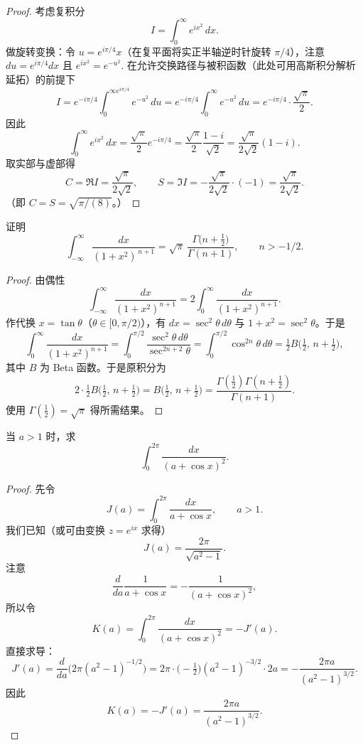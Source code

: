 \documentclass[lang=cn,10pt]{elegantbook}
\begin{document}
	\begin{proof}
		考虑复积分
		\[
		I=\int_0^\infty e^{i x^2}\,dx.
		\]
		做旋转变换：令 \(u=e^{i\pi/4}x\)（在复平面将实正半轴逆时针旋转 \(\pi/4\)），注意 \(du=e^{i\pi/4}dx\) 且 \(e^{ix^2}=e^{-u^2}\). 在允许交换路径与被积函数（此处可用高斯积分解析延拓）的前提下
		\[
		I=e^{-i\pi/4}\int_0^{\infty e^{i\pi/4}} e^{-u^2}\,du
		= e^{-i\pi/4}\int_0^{\infty} e^{-u^2}\,du
		= e^{-i\pi/4}\cdot\frac{\sqrt{\pi}}{2}.
		\]
		因此
		\[
		\int_0^\infty e^{ix^2}\,dx = \frac{\sqrt{\pi}}{2} e^{-i\pi/4}
		= \frac{\sqrt{\pi}}{2}\frac{1-i}{\sqrt{2}} = \frac{\sqrt{\pi}}{2\sqrt{2}}(1-i).
		\]
		取实部与虚部得
		\[
		C=\Re I=\frac{\sqrt{\pi}}{2\sqrt{2}},\qquad
		S=\Im I=-\frac{\sqrt{\pi}}{2\sqrt{2}}\cdot(-1)=\frac{\sqrt{\pi}}{2\sqrt{2}}.
		\]
		（即 \(C=S=\sqrt{\pi/(8)}\)。）
	\end{proof}
	
	\bigskip
	
	\begin{example}
		证明
		\[
		\int_{-\infty}^{\infty}\frac{dx}{(1+x^2)^{\,n+1}}
		=\sqrt{\pi}\,\frac{\Gamma\!\big(n+\tfrac12\big)}{\Gamma(n+1)},\qquad n>-1/2.
		\]
	\end{example}
	
	\begin{proof}
		由偶性
		\[
		\int_{-\infty}^{\infty}\frac{dx}{(1+x^2)^{n+1}}
		=2\int_0^\infty\frac{dx}{(1+x^2)^{n+1}}.
		\]
		作代换 \(x=\tan\theta\)（\(\theta\in[0,\pi/2)\)），有 \(dx=\sec^2\theta\,d\theta\) 与 \(1+x^2=\sec^2\theta\)。于是
		\[
		\int_0^\infty\frac{dx}{(1+x^2)^{n+1}}
		=\int_0^{\pi/2}\frac{\sec^2\theta\,d\theta}{\sec^{2n+2}\theta}
		=\int_0^{\pi/2}\cos^{2n}\theta\,d\theta
		=\tfrac12 B\!\Big(\tfrac{1}{2},\,n+\tfrac12\Big),
		\]
		其中 \(B\) 为 Beta 函数。于是原积分为
		\[
		2\cdot \tfrac12 B\!\Big(\tfrac{1}{2},\,n+\tfrac12\Big)
		= B\!\Big(\tfrac{1}{2},\,n+\tfrac12\Big)
		= \frac{\Gamma(\tfrac12)\Gamma(n+\tfrac12)}{\Gamma(n+1)}.
		\]
		使用 \(\Gamma(\tfrac12)=\sqrt{\pi}\) 得所需结果。
	\end{proof}
	
	\bigskip
	
	\begin{example}
		当 \(a>1\) 时，求
		\[
		\int_0^{2\pi}\frac{dx}{(a+\cos x)^2}.
		\]
	\end{example}
	
	\begin{proof}
		先令
		\[
		J(a)=\int_0^{2\pi}\frac{dx}{a+\cos x},\qquad a>1.
		\]
		我们已知（或可由变换 \(z=e^{ix}\) 求得）
		\[
		J(a)=\frac{2\pi}{\sqrt{a^2-1}}.
		\]
		注意
		\[
		\frac{d}{da}\frac{1}{a+\cos x} = -\frac{1}{(a+\cos x)^2},
		\]
		所以令
		\[
		K(a)=\int_0^{2\pi}\frac{dx}{(a+\cos x)^2} = -J'(a).
		\]
		直接求导：
		\[
		J'(a)=\frac{d}{da}\Big(2\pi (a^2-1)^{-1/2}\Big)
		=2\pi\cdot\Big(-\tfrac12\Big)(a^2-1)^{-3/2}\cdot 2a
		=-\frac{2\pi a}{(a^2-1)^{3/2}}.
		\]
		因此
		\[
		K(a)=-J'(a)=\frac{2\pi a}{(a^2-1)^{3/2}}.
		\]
	\end{proof}
	
\end{document}
